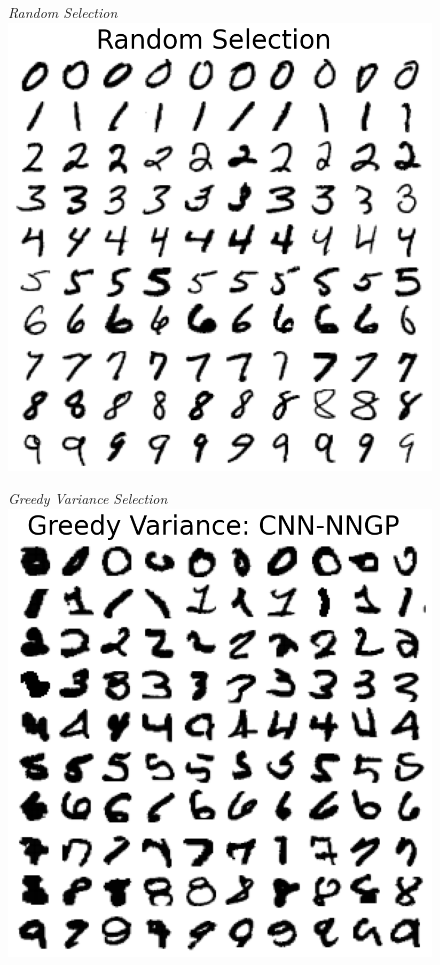 \documentclass{article}
\numberwithin{equation}{section}
\begin{document}
\begin{figure}[h!]
\small
\centering
\begin{minipage}{.25\textwidth}
  \centering
  \textit{Random Selection}
  \includegraphics[width=\linewidth, trim={0 0 0 1.5cm},clip]{thesis-report/figures/mnist_inducing_point/random_mnist_inducing_point_selection.png}
\end{minipage}%
\begin{minipage}{.25\textwidth}
  \centering
  \textit{Greedy Variance Selection}
  \includegraphics[width=\linewidth, trim={0 0 0 1.5cm},clip]{thesis-report/figures/mnist_inducing_point/greedy_mnist_cnn_nngp_inducing_point_selection.png}

\end{minipage}
\end{figure}
\end{document}

